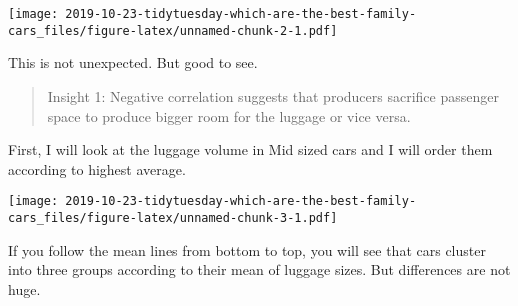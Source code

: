 \documentclass[]{article}
\newenvironment{Shaded}{\begin{snugshade}}{\end{snugshade}}
\newcommand{\DataTypeTok}[1]{\textcolor[rgb]{0.13,0.29,0.53}{#1}}
\newcommand{\DecValTok}[1]{\textcolor[rgb]{0.00,0.00,0.81}{#1}}
\newcommand{\KeywordTok}[1]{\textcolor[rgb]{0.13,0.29,0.53}{\textbf{#1}}}
\newcommand{\NormalTok}[1]{#1}
\newcommand{\OperatorTok}[1]{\textcolor[rgb]{0.81,0.36,0.00}{\textbf{#1}}}
\newcommand{\OtherTok}[1]{\textcolor[rgb]{0.56,0.35,0.01}{#1}}
\newcommand{\StringTok}[1]{\textcolor[rgb]{0.31,0.60,0.02}{#1}}
\begin{document}
\texttt{[image: 2019-10-23-tidytuesday-which-are-the-best-family-cars\_files/figure-latex/unnamed-chunk-2-1.pdf]}

This is not unexpected. But good to see.

\begin{quote}
Insight 1: Negative correlation suggests that producers sacrifice
passenger space to produce bigger room for the luggage or vice versa.
\end{quote}

First, I will look at the luggage volume in Mid sized cars and I will
order them according to highest average.

\begin{Shaded}
\end{Shaded}

\texttt{[image: 2019-10-23-tidytuesday-which-are-the-best-family-cars\_files/figure-latex/unnamed-chunk-3-1.pdf]}

If you follow the mean lines from bottom to top, you will see that cars
cluster into three groups according to their mean of luggage sizes. But
differences are not huge.
\end{document}
